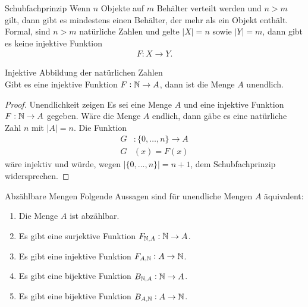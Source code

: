 \begin{lemma}{Schubfachprinzip}
    Wenn $n$ Objekte auf $m$ Behälter verteilt werden und $n>m$ gilt, dann gibt es mindestens einen Behälter, der mehr als ein Objekt enthält. Formal, sind $n>m$ natürliche Zahlen und gelte $|X|= n$ sowie $|Y|=m$, dann gibt es keine injektive Funktion
    \begin{align*}
    F: X\to Y.
    \end{align*}
\end{lemma}

\begin{lemma}{Injektive Abbildung der natürlichen Zahlen}\\
    Gibt es eine injektive Funktion $F:\mathbb{N}\to A$, dann ist die Menge $A$ unendlich.
\end{lemma}

\begin{proof}{Unendlichkeit zeigen}
    Es sei eine Menge $A$ und eine injektive Funktion $F:\mathbb{N}\to A$ gegeben. Wäre die Menge $A$ endlich, dann gäbe es eine natürliche Zahl $n$ mit $|A|=n$. Die Funktion
    \begin{align*}
    G&:\{0,\dots,n\}\to A\\
    G&(x) = F(x)
    \end{align*}
    wäre injektiv und würde, wegen $|\{0,\dots,n\}|=n+1$, dem Schubfachprinzip widersprechen.
\end{proof}

\begin{lemma}{Abzählbare Mengen}
    Folgende Aussagen sind für unendliche Mengen $A$ äquivalent:
    \begin{enumerate}
        \item Die Menge $A$ ist abzählbar.
        \item Es gibt eine surjektive Funktion $F_{\mathbb{N},A}:\mathbb{N}\to A$.
        \item Es gibt eine injektive Funktion $F_{A,\mathbb{N}}:A\to\mathbb{N}$.
        \item Es gibt eine bijektive Funktion $B_{\mathbb{N},A}:\mathbb{N}\to A$.
        \item Es gibt eine bijektive Funktion $B_{A,\mathbb{N}}:A\to\mathbb{N}$.
    \end{enumerate}
\end{lemma}

